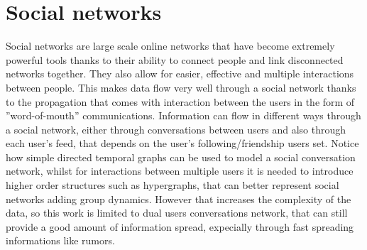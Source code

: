 \section{Social networks}
\label{sec:socialnetworks}
Social networks are large scale online networks that have become extremely powerful tools thanks to their ability to connect people and link disconnected networks together. They also allow for easier, effective and multiple interactions between people. This makes data flow very well through a social network thanks to the propagation that comes with interaction between the users in the form of ”word-of-mouth” communications. Information can flow in different ways through a social network, either through conversations between users and also through each user's feed, that depends on the user's following/friendship users set. Notice how simple directed temporal graphs can be used to model a social conversation network, whilst for interactions between multiple users it is needed to introduce higher order structures such as hypergraphs, that can better represent social networks adding group dynamics. However that increases the complexity of the data, so this work is limited to dual users conversations network, that can still provide a good amount of information spread, expecially through fast spreading informations like rumors\cite{10.2307/45018860}.

